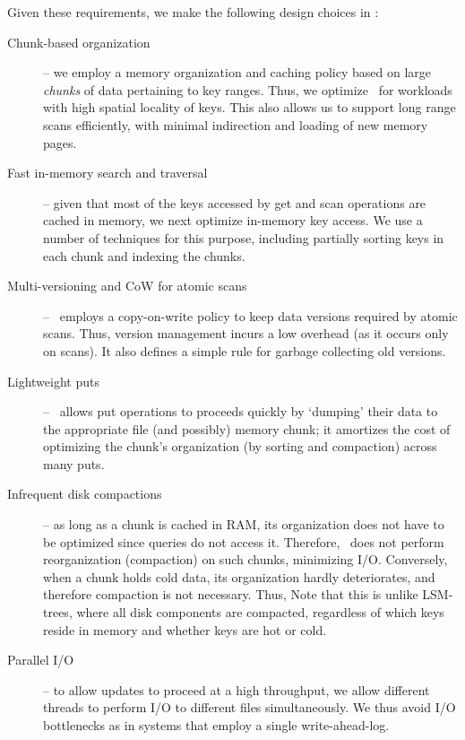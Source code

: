 Given these requirements, we make the following design choices in \sys:
\begin{description}
\item[Chunk-based organization] -- we employ a memory organization and caching policy based on large \emph{chunks} of data
pertaining to key ranges. Thus, we optimize \sys\ for workloads with high spatial locality of keys. This also allows us to support 
long range scans efficiently, with minimal indirection and loading of new memory pages. 
\item[Fast in-memory search and traversal] -- given that most of the keys accessed by get and scan operations are cached in memory, 
we next optimize in-memory key access. We use a number of techniques for this purpose, including partially sorting keys in each chunk and 
indexing the chunks.
\item[Multi-versioning and CoW for atomic scans] -- \sys\ employs a copy-on-write policy to keep data versions required by atomic scans.
Thus, version management incurs a low overhead (as it occurs only on scans). It also defines a simple rule for garbage collecting old versions.
\item[Lightweight puts] -- \sys\ allows put operations to proceeds quickly by `dumping' their data to the appropriate file (and possibly) memory chunk; 
it amortizes the cost of optimizing the chunk's organization (by sorting and compaction) across many puts.  
\item[Infrequent disk compactions] -- as long as a chunk is cached in RAM, its organization does not have to be optimized since 
queries do not access it. Therefore, \sys\ does not perform reorganization (compaction) on such chunks, minimizing I/O. 
Conversely, when a chunk holds cold data, its organization hardly deteriorates, and therefore compaction is not necessary.
Thus,  
Note that this is unlike LSM-trees, where all disk components are compacted, regardless of which keys reside in memory and whether 
keys are hot or cold. 
\item[Parallel I/O] -- to allow updates to proceed at a high throughput, we allow different threads to perform I/O to different files simultaneously.
We thus avoid I/O bottlenecks as in systems that employ a single write-ahead-log.
\end{description} 